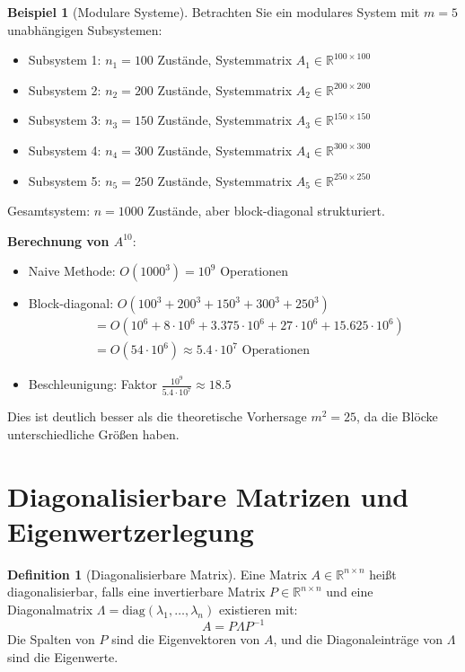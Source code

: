 ﻿\documentclass[a4paper,12pt]{report}
\theoremstyle{definition}
\newtheorem{definition}{Definition}
\newtheorem{beispiel}{Beispiel}
\begin{document}
	\begin{beispiel}[Modulare Systeme]
		Betrachten Sie ein modulares System mit $m = 5$ unabhängigen Subsystemen:
		\begin{itemize}
			\item Subsystem 1: $n_1 = 100$ Zustände, Systemmatrix $A_1 \in \mathbb{R}^{100 \times 100}$
			\item Subsystem 2: $n_2 = 200$ Zustände, Systemmatrix $A_2 \in \mathbb{R}^{200 \times 200}$
			\item Subsystem 3: $n_3 = 150$ Zustände, Systemmatrix $A_3 \in \mathbb{R}^{150 \times 150}$
			\item Subsystem 4: $n_4 = 300$ Zustände, Systemmatrix $A_4 \in \mathbb{R}^{300 \times 300}$
			\item Subsystem 5: $n_5 = 250$ Zustände, Systemmatrix $A_5 \in \mathbb{R}^{250 \times 250}$
		\end{itemize}
		
		Gesamtsystem: $n = 1000$ Zustände, aber block-diagonal strukturiert.
		
		\textbf{Berechnung von $A^{10}$}:
		\begin{itemize}
			\item Naive Methode: $O(1000^3) = 10^9$ Operationen
			\item Block-diagonal: $O(100^3 + 200^3 + 150^3 + 300^3 + 250^3)$
			\begin{align}
				&= O(10^6 + 8 \cdot 10^6 + 3.375 \cdot 10^6 + 27 \cdot 10^6 + 15.625 \cdot 10^6) \\
				&= O(54 \cdot 10^6) \approx 5.4 \cdot 10^7 \text{ Operationen}
			\end{align}
			\item Beschleunigung: Faktor $\frac{10^9}{5.4 \cdot 10^7} \approx 18.5$
		\end{itemize}
		
		Dies ist deutlich besser als die theoretische Vorhersage $m^2 = 25$, da die Blöcke unterschiedliche Größen haben.
	\end{beispiel}
	
	\section{Diagonalisierbare Matrizen und Eigenwertzerlegung}
	
	\begin{definition}[Diagonalisierbare Matrix]
		Eine Matrix $A \in \mathbb{R}^{n \times n}$ heißt diagonalisierbar, falls eine invertierbare Matrix $P \in \mathbb{R}^{n \times n}$ und eine Diagonalmatrix $\Lambda = \text{diag}(\lambda_1, \ldots, \lambda_n)$ existieren mit:
		\[
		A = P \Lambda P^{-1}
		\]
		Die Spalten von $P$ sind die Eigenvektoren von $A$, und die Diagonaleinträge von $\Lambda$ sind die Eigenwerte.
	\end{definition}
	
\end{document}
